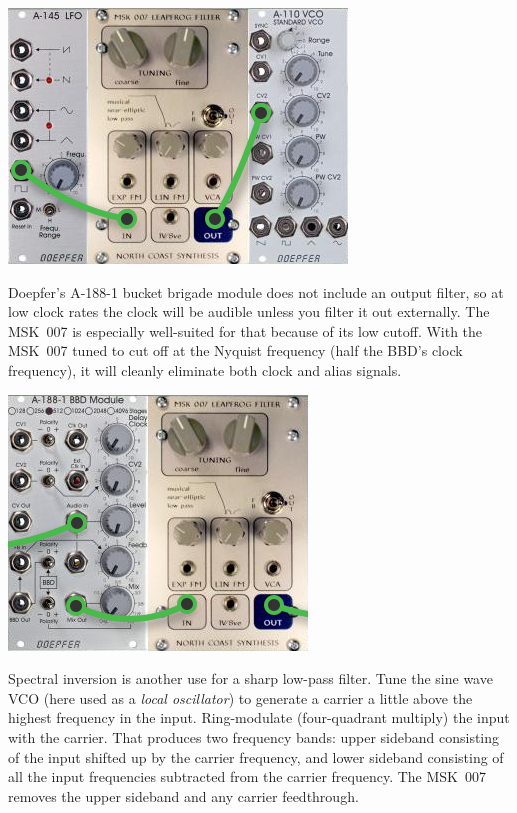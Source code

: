 \nopagebreak\noindent
{\hspace*{\fill}\includegraphics[scale=0.6]{patch7.png}\hspace*{\fill}\par} 

Doepfer's A-188-1 bucket brigade module does not include an output filter,
so at low clock rates the clock will be audible unless you filter it out
externally.  The MSK~007 is especially well-suited for that because of its
low cutoff.  With the MSK~007 tuned to cut off at the Nyquist frequency
(half the BBD's clock frequency), it will cleanly eliminate both clock and
alias signals.

\nopagebreak\noindent
{\hspace*{\fill}\includegraphics[scale=0.6]{patch8.png}\hspace*{\fill}\par} 

Spectral inversion is another use for a sharp low-pass filter.  Tune the
sine wave VCO (here used as a \emph{local oscillator}) to generate a carrier
a little above the highest frequency in the input.  Ring-modulate
(four-quadrant multiply) the input with the carrier.  That produces two
frequency bands: upper sideband consisting of the input shifted up by the
carrier frequency, and lower sideband consisting of all the input
frequencies subtracted from the carrier frequency.  The MSK~007
removes the upper sideband and any carrier feedthrough.

